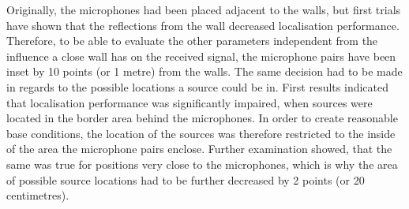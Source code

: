 Originally, the microphones had been placed adjacent to the walls, but first trials have shown that the reflections from the wall decreased localisation performance. Therefore, to be able to evaluate the other parameters independent from the influence a close wall has on the received signal, the microphone pairs have been inset by 10 points (or 1 metre) from the walls. The same decision had to be made in regards to the possible locations a source could be in. First results indicated that localisation performance was significantly impaired, when sources were located in the border area behind the microphones. In order to create reasonable base conditions, the location of the sources was therefore restricted to the inside of the area the microphone pairs enclose. Further examination showed, that the same was true for positions very close to the microphones, which is why the area of possible source locations had to be further decreased by 2 points (or 20 centimetres).

